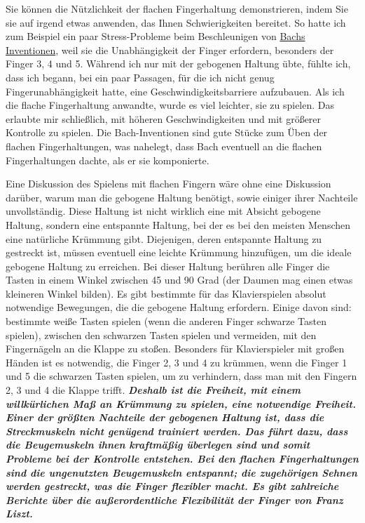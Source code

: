 Sie können die Nützlichkeit der flachen Fingerhaltung demonstrieren, indem Sie sie auf irgend etwas anwenden, das Ihnen Schwierigkeiten bereitet.
So hatte ich zum Beispiel ein paar Stress-Probleme beim Beschleunigen von \hyperref[c1iii20]{Bachs Inventionen}, weil sie die Unabhängigkeit der Finger erfordern, besonders der Finger 3, 4 und 5.
Während ich nur mit der gebogenen Haltung übte, fühlte ich, dass ich begann, bei ein paar Passagen, für die ich nicht genug Fingerunabhängigkeit hatte, eine Geschwindigkeitsbarriere aufzubauen.
Als ich die flache Fingerhaltung anwandte, wurde es viel leichter, sie zu spielen.
Das erlaubte mir schließlich, mit höheren Geschwindigkeiten und mit größerer Kontrolle zu spielen.
Die Bach-Inventionen sind gute Stücke zum Üben der flachen Fingerhaltungen, was nahelegt, dass Bach eventuell an die flachen Fingerhaltungen dachte, als er sie komponierte.

Eine Diskussion des Spielens mit flachen Fingern wäre ohne eine Diskussion darüber, warum man die gebogene Haltung benötigt, sowie einiger ihrer Nachteile unvollständig.
Diese Haltung ist nicht wirklich eine mit Absicht gebogene Haltung, sondern eine entspannte Haltung, bei der es bei den meisten Menschen eine natürliche Krümmung gibt.
Diejenigen, deren entspannte Haltung zu gestreckt ist, müssen eventuell eine leichte Krümmung hinzufügen, um die ideale gebogene Haltung zu erreichen.
Bei dieser Haltung berühren alle Finger die Tasten in einem Winkel zwischen 45 und 90 Grad (der Daumen mag einen etwas kleineren Winkel bilden).
Es gibt bestimmte für das Klavierspielen absolut notwendige Bewegungen, die die gebogene Haltung erfordern.
Einige davon sind: bestimmte weiße Tasten spielen (wenn die anderen Finger schwarze Tasten spielen), zwischen den schwarzen Tasten spielen und vermeiden, mit den Fingernägeln an die Klappe zu stoßen.
Besonders für Klavierspieler mit großen Händen ist es notwendig, die Finger 2, 3 und 4 zu krümmen, wenn die Finger 1 und 5 die schwarzen Tasten spielen, um zu verhindern, dass man mit den Fingern 2, 3 und 4 die Klappe trifft.
\textbf{\textit{Deshalb ist die Freiheit, mit einem willkürlichen Maß an Krümmung zu spielen, eine notwendige Freiheit.
Einer der größten Nachteile der gebogenen Haltung ist, dass die Streckmuskeln nicht genügend trainiert werden.
Das führt dazu, dass die Beugemuskeln ihnen kraftmäßig überlegen sind und somit Probleme bei der Kontrolle entstehen.
Bei den flachen Fingerhaltungen sind die ungenutzten Beugemuskeln entspannt; die zugehörigen Sehnen werden gestreckt, was die Finger flexibler macht.
Es gibt zahlreiche Berichte über die außerordentliche Flexibilität der Finger von Franz Liszt.}}

